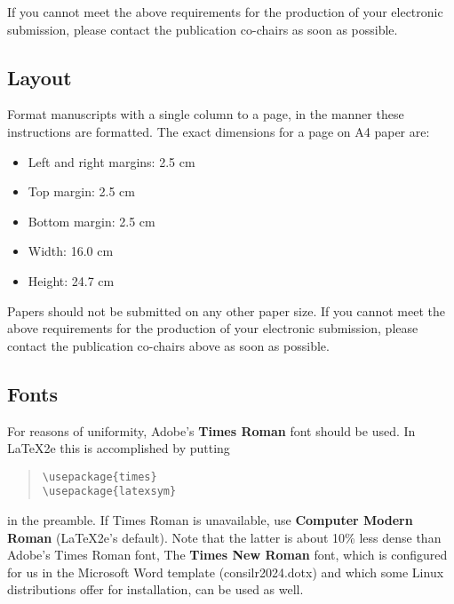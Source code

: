 \documentclass[11pt]{article}
\begin{document}
If you cannot meet the above requirements
for the production of your electronic submission, please contact the
publication co-chairs as soon as possible.


\subsection{Layout}
\label{ssec:layout}

Format manuscripts with a single column to a page, in the manner these
instructions are formatted. The exact dimensions for a page on A4
paper are:

\begin{itemize}
\item Left and right margins: 2.5 cm
\item Top margin: 2.5 cm
\item Bottom margin: 2.5 cm
\item Width: 16.0 cm
\item Height: 24.7 cm
\end{itemize}

\noindent Papers should not be submitted on any other paper size.
If you cannot meet the above requirements for
the production of your electronic submission, please contact the
publication co-chairs above as soon as possible.


\subsection{Fonts}

For reasons of uniformity, Adobe's {\bf Times Roman} font should be
used. In \LaTeX2e{} this is accomplished by putting

\begin{quote}
\begin{verbatim}
\usepackage{times}
\usepackage{latexsym}
\end{verbatim}
\end{quote}
in the preamble. If Times Roman is unavailable, use {\bf Computer
  Modern Roman} (\LaTeX2e{}'s default).  Note that the latter is about
  10\% less dense than Adobe's Times Roman font, The \textbf{Times New Roman} font, which is configured for us in the Microsoft Word template (consilr2024.dotx) and which some Linux distributions offer for installation, can be used as well.
\end{document}
